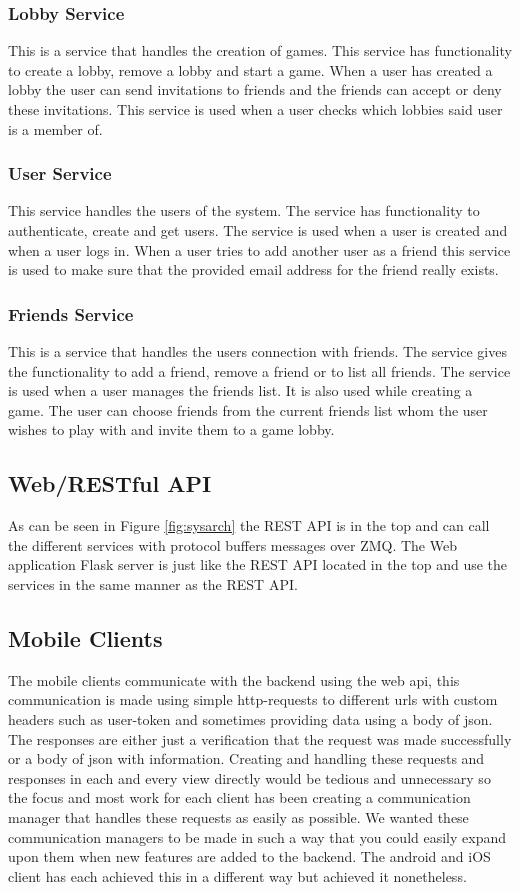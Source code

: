 \subsubsection{Lobby Service}
This is a service that handles the creation of games. This service has functionality to create a lobby, remove a lobby and start a game. When a user has created a lobby the user can send invitations to friends and the friends can accept or deny these invitations. This service is used when a user checks which lobbies said user is a member of. 

\subsubsection{User Service}
This service handles the users of the system. The service has functionality to authenticate, create and get users. The service is used when a user is created and when a user logs in. When a user tries to add another user as a friend this service is used to make sure that the provided email address for the friend really exists. 

\subsubsection{Friends Service}
This is a service that handles the users connection with friends. The service gives the functionality to add a friend, remove a friend or to list all friends. The service is used when a user manages the friends list. It is also used while creating a game. The user can choose friends from the current friends list whom the user wishes to play with and invite them to a game lobby.

\subsection{Web/RESTful API}
As can be seen in Figure \ref{fig:sysarch} the REST API is in the top and can call the different services with protocol buffers messages over ZMQ. The Web application Flask server is just like the REST API located in the top and use the services in the same manner as the REST API.

\subsection{Mobile Clients}
The mobile clients communicate with the backend using the web api, this communication is made using simple http-requests to different urls with custom headers such as user-token and sometimes providing data using a body of json. The responses are either just a verification that the request was made successfully or a body of json with information. Creating and handling these requests and responses in each and every view directly would be tedious and unnecessary so the focus and most work for each client has been creating a communication manager that handles these requests as easily as possible. We wanted these communication managers to be made in such a way that you could easily expand upon them when new features are added to the backend. The android and iOS client has each achieved this in a different way but achieved it nonetheless. 


